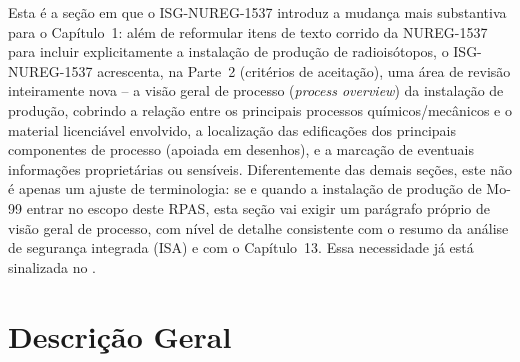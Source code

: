 \begin{avaliacaointerim}
Esta \'e a se\c{c}\~ao em que o ISG-NUREG-1537 introduz a mudan\c{c}a mais
substantiva para o Cap\'itulo~1: al\'em de reformular itens de texto
corrido da NUREG-1537 para incluir explicitamente a instala\c{c}\~ao de
produ\c{c}\~ao de radiois\'otopos, o ISG-NUREG-1537 acrescenta, na Parte~2
(crit\'erios de aceita\c{c}\~ao), uma \'area de revis\~ao inteiramente
nova -- a vis\~ao geral de processo (\emph{process overview}) da
instala\c{c}\~ao de produ\c{c}\~ao, cobrindo a rela\c{c}\~ao entre os
principais processos qu\'imicos/mec\^anicos e o material licenci\'avel
envolvido, a localiza\c{c}\~ao das edifica\c{c}\~oes dos principais
componentes de processo (apoiada em desenhos), e a marca\c{c}\~ao de
eventuais informa\c{c}\~oes propriet\'arias ou sens\'iveis. Diferentemente
das demais se\c{c}\~oes, este n\~ao \'e apenas um ajuste de terminologia:
se e quando a instala\c{c}\~ao de produ\c{c}\~ao de Mo-99 entrar no
escopo deste RPAS, esta se\c{c}\~ao vai exigir um par\'agrafo pr\'oprio de
vis\~ao geral de processo, com n\'ivel de detalhe consistente com o
resumo da an\'alise de seguran\c{c}a integrada (ISA) e com o
Cap\'itulo~13. Essa necessidade j\'a est\'a sinalizada no .
\end{avaliacaointerim}

\section{Descri\c{c}\~ao Geral}
\label{sec:1.3}

